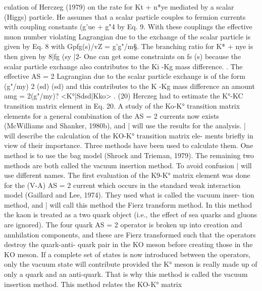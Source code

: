 \documentclass[twoside]{article}
\begin{document}
{{{{{{{{{{{{{{culation of Herczeg (1979) on the rate for Kt + n*ye mediated by a scalar
(Higgs) particle. He assumes that a scalar particle  couples to fermion
currents with coupling constants (g'ue + g"4%
by Eq. 9. With these couplings the effective muon number violating
Lagrangian due to the exchange of the scalar particle is given by Eq. 8
with Gpfg(s)/vZ = g'g"/m§. The branching ratio for K* + nye is then
given by 8|fg (sy |2- One can get some constraints on fs (s) because the
scalar particle exchange also contributes to the Ki -Kg mass difference.
. 
The effective AS = 2 Lagrangian due to the scalar particle exchange is
of the form (g"/my) 2 (sd) (sd) and this contributes to the K -Kg mass
difference an amount
amg = 2(g"/my)? <K°|Sdsd|Kko> . (20)
Herczeg had to estimate the K°-KC transition matrix element in Eq. 20.
A study of the Ko-K° transition matrix elements for a general combination
of the AS = 2 currents now exists (McWilliams and Shanker, 1980b), and
| will use the results for the analysis.
| will describe the calculation of the KO-K° transition matrix ele-
ments briefly in view of their importance. Three methods have been
used to calculate them. One method is to use the bag model (Shrock and
Trieman, 1979). The remaining two methods are both called the vacuum
insertion method. To avoid confusion | will use different names. The
first evaluation of the K9-K° matrix element was done for the (V-A)
AS = 2 current which occurs in the standard weak interaction model
(Gaillard and Lee, 1974). They used what is called the vacuum inser-
tion method, and | will call this method the Fierz transform method.
In this method the kaon is treated as a two quark object (i.e., the
effect of sea quarks and gluons are ignored). The four quark AS = 2
operator is broken up into creation and annhilation components, and these
are Fierz transformed such that the operators destroy the quark-anti-
quark pair in the KO meson before creating those in the KO meson. If
a complete set of states is now introduced between the operators, only
the vacuum state will contribute provided the K° meson is really made
up of only a quark and an anti-quark. That is why this method is called
the vacuum insertion method. This method relates the KO-K° matrix

}}}}}}}}}}}}}}
\end{document}
